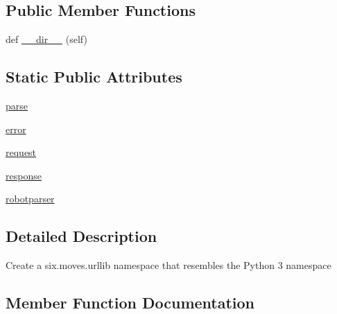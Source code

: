 \subsection*{Public Member Functions}
\begin{DoxyCompactItemize}
\item 
def \hyperlink{classpip_1_1__vendor_1_1six_1_1Module__six__moves__urllib_a26e0d06ea5476d1af4bba0ba47f3fe35}{\+\_\+\+\_\+dir\+\_\+\+\_\+} (self)
\end{DoxyCompactItemize}
\subsection*{Static Public Attributes}
\begin{DoxyCompactItemize}
\item 
\hyperlink{classpip_1_1__vendor_1_1six_1_1Module__six__moves__urllib_aca42da491e92e67d49fa44b7c40cf7b8}{parse}
\item 
\hyperlink{classpip_1_1__vendor_1_1six_1_1Module__six__moves__urllib_a45af26bdb95db25793bd4b4cdad6f593}{error}
\item 
\hyperlink{classpip_1_1__vendor_1_1six_1_1Module__six__moves__urllib_ab822a8f7363f4b9e06d68abe27792454}{request}
\item 
\hyperlink{classpip_1_1__vendor_1_1six_1_1Module__six__moves__urllib_a8c6e5834f2419bbcba8ccd631a50f353}{response}
\item 
\hyperlink{classpip_1_1__vendor_1_1six_1_1Module__six__moves__urllib_a5af3858c121f3528561a2fc48ebc0a65}{robotparser}
\end{DoxyCompactItemize}


\subsection{Detailed Description}
\begin{DoxyVerb}Create a six.moves.urllib namespace that resembles the Python 3 namespace\end{DoxyVerb}
 

\subsection{Member Function Documentation}
\mbox{\label{classpip_1_1__vendor_1_1six_1_1Module__six__moves__urllib_a26e0d06ea5476d1af4bba0ba47f3fe35}} 
